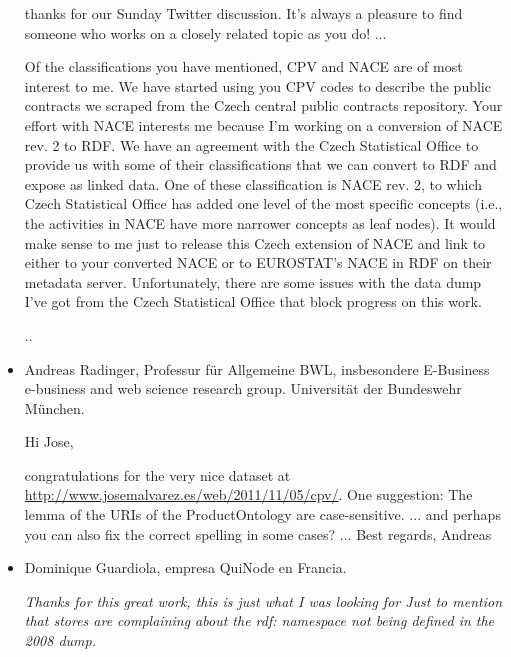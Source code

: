 \begin{itemize}
\begin{Frame}
\begin{itshape}
thanks for our Sunday Twitter discussion. It's always a pleasure to
find someone who works on a closely related topic as you do!
...

Of the classifications you have mentioned, CPV and NACE are of most interest to
me. We have started using you CPV codes to describe the public contracts we
scraped from the Czech central public contracts repository. Your effort with
NACE interests me because I'm working on a conversion of NACE rev. 2 to RDF. We
have an agreement with the Czech Statistical Office to provide us with some
of their classifications that we can convert to RDF and expose as linked data.
One of these classification is NACE rev. 2, to which Czech Statistical Office
has added one level of the most specific concepts (i.e., the activities in NACE
have more narrower concepts as leaf nodes). It would make sense to me just to
release this Czech extension of NACE and link to either to your converted NACE
or to EUROSTAT's NACE in RDF on their metadata server. Unfortunately, there
are some issues with the data dump I've got from the Czech Statistical Office
that block progress on this work.

..
\end{itshape}
\end{Frame}

\item Andreas Radinger, Professur f\"{u}r Allgemeine BWL, insbesondere E-Business e-business and web science research group. Universit\"{a}t der Bundeswehr M\"{u}nchen.

\begin{Frame}
\begin{itshape}
Hi Jose,

congratulations for the very nice dataset at \url{http://www.josemalvarez.es/web/2011/11/05/cpv/}.
One suggestion:
The lemma of the URIs of the ProductOntology are case-sensitive.
...
and perhaps you can also fix the correct spelling in some cases?
...
Best regards,
Andreas
\end{itshape}
\end{Frame}


\item Dominique Guardiola, empresa QuiNode en Francia.

\begin{Frame}
\begin{itshape}
\textit{Thanks for this great work, this is just what I was looking for
Just to mention that stores are complaining about the rdf: namespace not being defined in the 2008 dump.}
\end{itshape}
\end{Frame}


\end{itemize}

